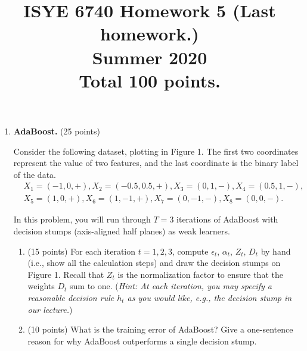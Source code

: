 \documentclass[twoside,12pt]{article}
\begin{document}
\title{ISYE 6740 Homework 5 (Last homework.)\\ 
Summer 2020\\
\small Total 100 points.}

\date{}
\maketitle


\begin{enumerate}


\item  {\bf AdaBoost.} (25 points)

Consider the following dataset, plotting in Figure 1. The first two coordinates represent the value of two features, and the last coordinate is the binary label of the data.
\begin{equation*}
\begin{split}
&X_1 = (-1, 0, +), X_2 = (-0.5, 0.5, +), X_3 = (0, 1, -), X_4 = (0.5, 1, -), \\
&X_5 = (1, 0, +), X_6 = (1, -1, +), X_7 = (0, -1, -), X_8 = (0, 0, -).
\end{split}
\end{equation*}

In this problem, you will run through $T = 3$ iterations of AdaBoost with decision stumps (axis-aligned half planes) as weak learners.

\begin{enumerate}
\item (15 points) For each iteration $t = 1, 2, 3$, compute $\epsilon_t$, $\alpha_t$, $Z_t$, $D_t$ by hand (i.e., show all the calculation steps) and draw the decision stumps on Figure 1. Recall that $Z_t$ is the normalization factor to ensure that the weights $D_t$ sum to one. ({\it Hint: At each iteration, you may specify a reasonable decision rule $h_t$ as you would like, e.g., the decision stump in our lecture.})

\item (10 points) What is the training error of AdaBoost? Give a one-sentence reason for why AdaBoost outperforms a single decision stump.
\end{enumerate}



\end{enumerate}
\end{document}
